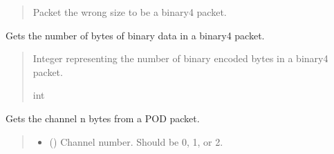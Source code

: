 \documentclass[letterpaper,10pt,english]{sphinxmanual}
\begin{document}
\begin{fulllineitems}
\begin{fulllineitems}
\begin{quote}
\begin{description}
\sphinxAtStartPar
{} \textendash{} Packet the wrong size to be a binary4 packet.

\end{description}\end{quote}

\end{fulllineitems}


\begin{fulllineitems}
\label{\detokenize{PodApi.Packets:PodApi.Packets.Binary4.PacketBinary4.GetBinaryLength}}
\pysigstartsignatures
{}
\pysigstopsignatures
\sphinxAtStartPar
Gets the number of bytes of binary data in a binary4 packet.
\begin{quote}\begin{description}
\sphinxAtStartPar
Integer representing the number of binary encoded bytes in a binary4 packet.

\sphinxAtStartPar
int

\end{description}\end{quote}

\end{fulllineitems}


\begin{fulllineitems}
\label{\detokenize{PodApi.Packets:PodApi.Packets.Binary4.PacketBinary4.GetCh}}
\pysigstartsignatures
{}
\pysigstopsignatures
\sphinxAtStartPar
Gets the channel n bytes from a POD packet.
\begin{quote}\begin{description}
\begin{itemize}
\item {} 
\sphinxAtStartPar
{} () \textendash{} Channel number. Should be 0, 1, or 2.


\end{itemize}
\end{description}
\end{quote}
\end{fulllineitems}
\end{fulllineitems}
\end{document}

